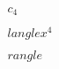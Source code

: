 \documentclass[preview]{standalone}
\begin{document}
\begin{align*}
c_4 \\\\langle x^4 \\\\rangle
\end{align*}
\end{document}
